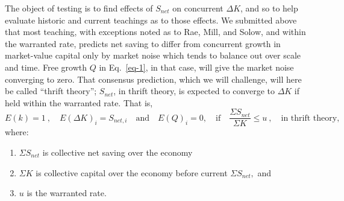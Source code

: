 \documentclass[a4paper,fleqn]{latex_styles/cas-sc}
\begin{document}
The object of testing is to find effects of \(S_{net}\) on concurrent
\(\Delta K\), and so to help evaluate historic and current teachings as
to those effects. We submitted above that most teaching, with exceptions
noted as to Rae, Mill, and Solow, and within the warranted rate,
predicts net saving to differ from concurrent growth in market-value
capital only by market noise which tends to balance out over scale and
time. Free growth \(Q\) in Eq.~\eqref{eq-1}, in that case, will give
the market noise converging to zero. That consensus prediction, which we
will challenge, will here be called ``thrift theory''; \(S_{net}\), in
thrift theory, is expected to converge to \(\Delta K\) if held within
the warranted rate. That is,
%
\begin{equation}
    E(k) = 1\ , \quad E(\Delta K)_{i} = S_{net, i} \quad \text{and} \quad E(Q)_i = 0,
\quad \text{if} \quad
\frac{\Sigma S_{net}}{\Sigma K} \leq u\ ,\quad \text{in thrift theory,}
\label{eq-2}
\end{equation}
%
where:

\begin{enumerate}
\def\labelenumi{\arabic{enumi}.}
\item
  \(\Sigma S_{net}\) is collective net saving over the economy
\item
  \(\Sigma K\) is collective capital over the economy before current
  \(\Sigma S_{net},\) and
\item
  \(u\) is the warranted rate.
\end{enumerate}
\end{document}
